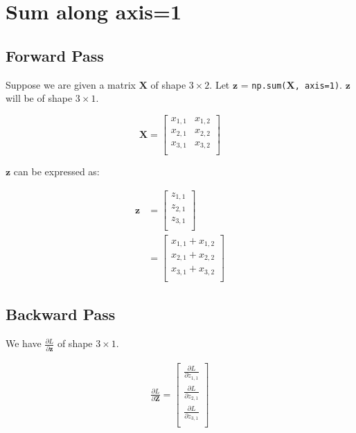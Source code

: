 \documentclass{article}
\newcommand{\vecr}[1]{\bm{#1}}
\newcommand{\matr}[1]{\mathbf{#1}} %
\begin{document}
\section{Sum along axis=1}
\subsection{Forward Pass}
Suppose we are given a matrix $\matr{X}$ of shape $3 \times 2$. Let $\vecr{z}$ = \verb|np.sum(|${\matr{X}}$\verb|, axis=1)|. $\vecr{z}$ will be of shape $3 \times 1$.

\begin{displaymath}
\matr{X} =
\begin{bmatrix}
x_{1,1} & x_{1,2} \\%
x_{2,1} & x_{2,2} \\%
x_{3,1} & x_{3,2} \\%
\end{bmatrix}
\end{displaymath}

$\vecr{z}$ can be expressed as:

\begin{align}
\vecr{z} &=
\begin{bmatrix}
z_{1,1} \\
z_{2,1} \\
z_{3,1} \\
\end{bmatrix}
\nonumber \\
&=
\begin{bmatrix}
x_{1,1} + x_{1,2} \\
x_{2,1} + x_{2,2} \\
x_{3,1} + x_{3,2} \\
\end{bmatrix}
\end{align}

\subsection{Backward Pass}
We have $\frac{\partial L}{\partial \vecr{z}}$ of shape $3 \times 1$.

\begin{align}
\frac{\partial L}{\partial \matr{Z}} =
\begin{bmatrix}
\frac{\partial L}{\partial z_{1,1}} \\[0.7em]
\frac{\partial L}{\partial z_{2,1}} \\[0.7em]
\frac{\partial L}{\partial z_{3,1}} \\[0.7em]
\end{bmatrix} \label{dZAsColumnVector_sum_along_axis_1}
\end{align}
\end{document}
